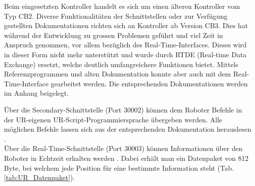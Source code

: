 		\newpage
		
		\begin{bfhNoteBox}
			Beim eingesetzten Kontroller handelt es sich um einen älteren Kontroller vom Typ CB2. Diverse Funktionalitäten der Schnittstellen oder zur Verfügung gestellten Dokumentationen richten sich an Kontroller ab Version CB3. Dies hat während der Entwicklung zu grossen Problemen geführt und viel Zeit in Anspruch genommen, vor allem bezüglich des Real-Time-Interfaces. Dieses wird in dieser Form nicht mehr unterstützt und wurde durch RTDE (Real-time Data Exchange) ersetzt, welche deutlich umfangreichere Funktionen bietet. Mittels Referenzprogrammen und alten Dokumentation konnte aber auch mit dem Real-Time-Interface gearbeitet werden. Die entsprechenden Dokumentationen werden im Anhang beigelegt.
		\end{bfhNoteBox}
		\vspace{3mm}
		Über die Secondary-Schnittstelle (Port 30002) können dem Roboter Befehle in der UR-eigenen UR-Script-Programmiersprache übergeben werden. Alle möglichen Befehle lassen sich aus der entsprechenden Dokumentation herauslesen \cite{URScript}. 
		\\
		Über die Real-Time-Schnittstelle (Port 30003) können Informationen über den Roboter in Echtzeit erhalten werden \cite{UR-RT-Interface}. Dabei erhält man ein Datenpaket von 812 Byte, bei welchem jede Position für eine bestimmte Information steht (Tab. \ref{tab:UR_Datenpaket}).
		
